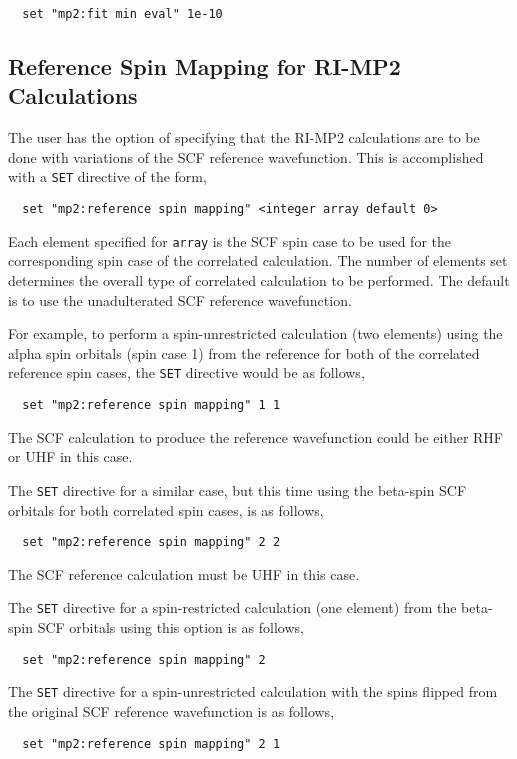 \begin{verbatim}
  set "mp2:fit min eval" 1e-10
\end{verbatim}

\subsection{Reference Spin Mapping for RI-MP2 Calculations}

The user has the option of specifying that the RI-MP2 calculations are
to be done with variations of the SCF reference wavefunction.  This is
accomplished with a \verb+SET+ directive of the form,

\begin{verbatim}
  set "mp2:reference spin mapping" <integer array default 0>
\end{verbatim}

Each element specified for \verb+array+ is the SCF spin case to be
used for the corresponding spin case of the correlated calculation.
The number of elements set determines the overall type of correlated
calculation to be performed.  The default is to use the unadulterated
SCF reference wavefunction.

For example, to perform a spin-unrestricted calculation (two elements)
using the alpha spin orbitals (spin case 1) from the reference for
both of the correlated reference spin cases, the \verb+SET+ directive
would be as follows,
\begin{verbatim}
  set "mp2:reference spin mapping" 1 1
\end{verbatim}
The SCF calculation to produce the reference wavefunction could be either
RHF or UHF in this case.

The \verb+SET+ directive for a similar case, but this time using the
beta-spin SCF orbitals for both correlated spin cases, is as follows,
\begin{verbatim}
  set "mp2:reference spin mapping" 2 2
\end{verbatim}
The SCF reference calculation must be UHF in this case.

The \verb+SET+ directive for a spin-restricted calculation (one
element) from the beta-spin SCF orbitals using this option is as
follows,
\begin{verbatim}
  set "mp2:reference spin mapping" 2
\end{verbatim}

The \verb+SET+ directive for a spin-unrestricted calculation with the
spins flipped from the original SCF reference wavefunction is as
follows,
\begin{verbatim}
  set "mp2:reference spin mapping" 2 1
\end{verbatim}


